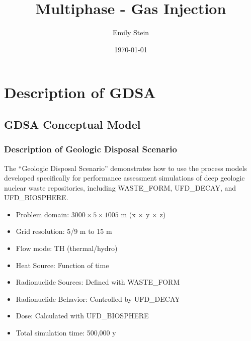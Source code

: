 \documentclass{beamer}
\begin{document}
\title{Multiphase - Gas Injection}
\author{Emily Stein}
\date{\today}


\section{Description of GDSA}

\subsection{GDSA Conceptual Model}

\begin{frame}\frametitle{Description of Geologic Disposal Scenario}
The ``Geologic Disposal Scenario'' demonstrates how to use the process models developed specifically for performance assessment simulations of deep geologic nuclear waste repositories, including WASTE\_FORM, UFD\_DECAY, and UFD\_BIOSPHERE.
\begin{itemize}
  \item Problem domain: $3000 \times 5 \times 1005$ m (x $\times$ y $\times$ z)
  \item Grid resolution: 5/9 m to 15 m
  \item Flow mode: TH (thermal/hydro)
  \item Heat Source: Function of time
  \item Radionuclide Sources: Defined with WASTE\_FORM
  \item Radionuclide Behavior: Controlled by UFD\_DECAY
  \item Dose: Calculated with UFD\_BIOSPHERE
  \item Total simulation time: 500,000 y
\end{itemize}

\end{frame}

\end{document}
